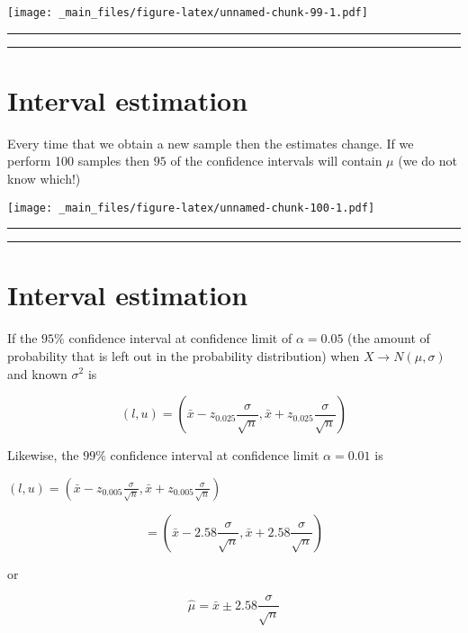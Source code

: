 \documentclass[
]{book}
\begin{document}
\texttt{[image: \_main\_files/figure-latex/unnamed-chunk-99-1.pdf]}

\begin{center}\rule{0.5\linewidth}{0.5pt}\end{center}

\begin{center}\rule{0.5\linewidth}{0.5pt}\end{center}

\hypertarget{interval-estimation-6}{%
\section{Interval estimation}\label{interval-estimation-6}}

Every time that we obtain a new sample then the estimates change. If we perform 100 samples then \(95%
\) of the confidence intervals will contain \(\mu\) (we do not know which!)

\texttt{[image: \_main\_files/figure-latex/unnamed-chunk-100-1.pdf]}

\begin{center}\rule{0.5\linewidth}{0.5pt}\end{center}

\begin{center}\rule{0.5\linewidth}{0.5pt}\end{center}

\hypertarget{interval-estimation-7}{%
\section{Interval estimation}\label{interval-estimation-7}}

If the \(95\%\) confidence interval at confidence limit of \(\alpha=0.05%
\) (the amount of probability that is left out in the probability distribution) when \(X \rightarrow N(\mu, \sigma)\) and known \(\sigma^2\) is

\[(l,u) = (\bar{x} - z_{0.025}\frac{\sigma}{\sqrt{n}},\bar{x} +z_{0.025} \frac{\sigma}{\sqrt{n}})\]

Likewise, the \(99\%\) confidence interval at confidence limit \(\alpha=0.01\) is

\((l,u) = (\bar{x} - z_{0.005}\frac{\sigma}{\sqrt{n}},\bar{x} + z_{0.005}\frac{\sigma}{\sqrt{n}})\)

\[= (\bar{x} - 2.58\frac{\sigma}{\sqrt{n}},\bar{x} + 2.58\frac{\sigma}{\sqrt{n}})\]

or

\[\hat{\mu}=\bar{x} \pm 2.58\frac{\sigma}{\sqrt{n}}\]
\end{document}
